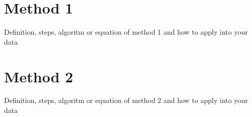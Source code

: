 \begin{enumerate}
\end{enumerate}

\section{Method 1}
Definition, steps, algoritm or equation of method 1 and how to apply into your data
\section{Method 2}
Definition, steps, algoritm or equation of method 2 and how to apply into your data